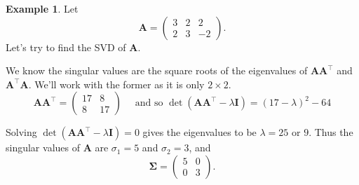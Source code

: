 \documentclass[]{book}
\theoremstyle{definition}
\theoremstyle{definition}
\newtheorem{example}{Example}[chapter]
\theoremstyle{definition}
\theoremstyle{remark}
\begin{document}
\begin{example}
\protect\hypertarget{exm:svd2}{}{\label{exm:svd2} }Let
\[\mathbf A= \left(\begin{array}{ccc}3&2&2\\
               2&3&-2\end{array}\right).\]
Let's try to find the SVD of \(\mathbf A\).

We know the singular values are the square roots of the eigenvalues of \(\mathbf A\mathbf A^\top\) and \(\mathbf A^\top\mathbf A\). We'll work with the former as it is only \(2\times 2\).
\[\mathbf A\mathbf A^\top =  \left(\begin{array}{cc}17&8\\
               8&17\end{array}\right) \quad \mbox{ and so } \det(\mathbf A\mathbf A^\top-\lambda \mathbf I)=(17-\lambda)^2-64
\]

Solving \(\det(\mathbf A\mathbf A^\top-\lambda \mathbf I)=0\) gives the eigenvalues to be \(\lambda=25\) or \(9\). Thus the singular values of \(\mathbf A\) are \(\sigma_1=5\) and \(\sigma_2=3\), and
\[\boldsymbol{\Sigma}=\left(\begin{array}{cc}5&0\\
               0&3\end{array}\right).\]


\end{example}
\end{document}

